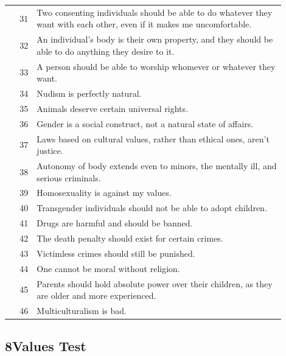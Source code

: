 \documentclass[11pt]{article}
\begin{document}
\begin{longtable}{r p{0.9\linewidth}}
\rowcolor{svProg} 31 & Two consenting individuals should be able to do whatever they want with each other, even if it makes me uncomfortable. \\
\rowcolor{svProg} 32 & An individual's body is their own property, and they should be able to do anything they desire to it. \\
\rowcolor{svProg} 33 & A person should be able to worship whomever or whatever they want. \\
\rowcolor{svProg} 34 & Nudism is perfectly natural. \\
\rowcolor{svProg} 35 & Animals deserve certain universal rights. \\
\rowcolor{svProg} 36 & Gender is a social construct, not a natural state of affairs. \\
\rowcolor{svProg} 37 & Laws based on cultural values, rather than ethical ones, aren't justice. \\
\rowcolor{svProg} 38 & Autonomy of body extends even to minors, the mentally ill, and serious criminals. \\
\rowcolor{svProg} 39 & Homosexuality is against my values. \\
\rowcolor{svProg} 40 & Transgender individuals should not be able to adopt children. \\
\rowcolor{svProg} 41 & Drugs are harmful and should be banned. \\
\rowcolor{svProg} 42 & The death penalty should exist for certain crimes. \\
\rowcolor{svProg} 43 & Victimless crimes should still be punished. \\
\rowcolor{svProg} 44 & One cannot be moral without religion. \\
\rowcolor{svProg} 45 & Parents should hold absolute power over their children, as they are older and more experienced. \\
\rowcolor{svProg} 46 & Multiculturalism is bad. \\

\end{longtable}


\newpage
\subsection{8Values Test}
\end{document}

